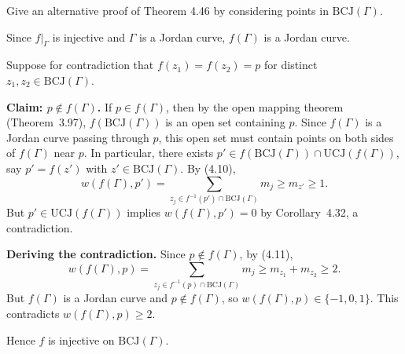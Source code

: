 \documentclass{article}
\begin{document}
Give an alternative proof of Theorem 4.46 by considering points in
$\mathrm{BCJ}(\Gamma)$.

\begin{solution}
  Since $f|_\Gamma$ is injective and $\Gamma$ is a Jordan curve,
  $f(\Gamma)$ is a Jordan curve.

  Suppose for contradiction that
  $f(z_1) = f(z_2) = p$ for distinct $z_1, z_2 \in \mathrm{BCJ}(\Gamma)$.

  \textbf{Claim: $p \notin f(\Gamma)$.}\;
  If $p \in f(\Gamma)$, then by the open mapping theorem
  (Theorem~3.97), $f(\mathrm{BCJ}(\Gamma))$ is an open set
  containing $p$.
  Since $f(\Gamma)$ is a Jordan curve passing through $p$,
  this open set must contain points on both sides of $f(\Gamma)$
  near $p$.
  In particular, there exists
  $p' \in f(\mathrm{BCJ}(\Gamma)) \cap \mathrm{UCJ}(f(\Gamma))$,
  say $p' = f(z')$ with $z' \in \mathrm{BCJ}(\Gamma)$.
  By (4.10),
  \[
    w(f(\Gamma), p')
    = \sum_{z_j \in f^{-1}(p') \cap \mathrm{BCJ}(\Gamma)} m_j
    \ge m_{z'} \ge 1.
  \]
  But $p' \in \mathrm{UCJ}(f(\Gamma))$ implies
  $w(f(\Gamma), p') = 0$ by Corollary~4.32, a contradiction.

  \textbf{Deriving the contradiction.}\;
  Since $p \notin f(\Gamma)$, by (4.11),
  \[
    w(f(\Gamma), p)
    = \sum_{z_j \in f^{-1}(p) \cap \mathrm{BCJ}(\Gamma)} m_j
    \ge m_{z_1} + m_{z_2} \ge 2.
  \]
  But $f(\Gamma)$ is a Jordan curve and $p \notin f(\Gamma)$,
  so $w(f(\Gamma), p) \in \{-1, 0, 1\}$.
  This contradicts $w(f(\Gamma), p) \ge 2$.

  Hence $f$ is injective on $\mathrm{BCJ}(\Gamma)$.\qedhere
\end{solution}
\end{document}
